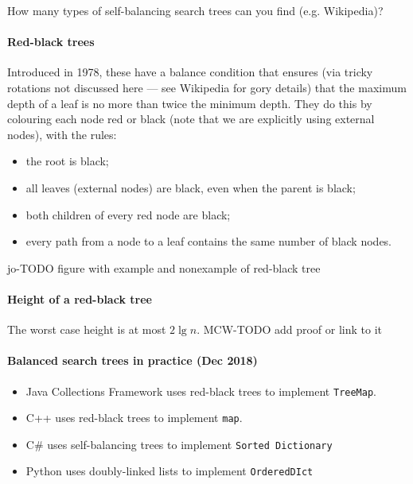 \begin{Boxample}[2]
How many types of self-balancing search trees can you find (e.g. Wikipedia)?

\end{Boxample}

\paragraph{Red-black trees}

Introduced in 1978, these have a balance condition that ensures (via tricky rotations not discussed here --- see Wikipedia for gory details) that the maximum depth of a leaf is no more than twice the minimum depth. They do this by colouring each node red or black (note that we are explicitly using external nodes), with the rules:
\begin{itemize}
\item the root is black;
\item all leaves (external nodes) are black, even when the parent is black;
\item both children of every red node are black;
\item every path from a node to a leaf contains the same number of black nodes.
\end{itemize}

jo-TODO figure with example and nonexample of red-black tree

\paragraph{Height of a red-black tree}
The worst case height is at most $2 \lg n$.
MCW-TODO add proof or link to it

\paragraph{Balanced search trees in practice (Dec 2018)}
\begin{itemize}
\item Java Collections Framework uses red-black trees to implement \texttt{TreeMap}.
\item C++  uses red-black trees to implement \texttt{map}.
\item C\# uses self-balancing trees to implement \texttt{Sorted Dictionary}
\item Python uses doubly-linked lists to implement \texttt{OrderedDIct}
\end{itemize}


